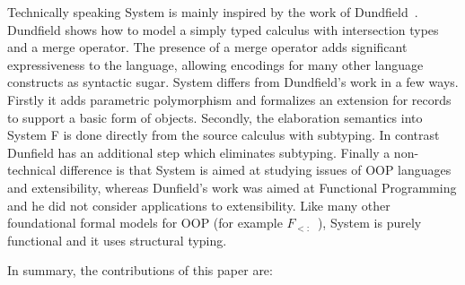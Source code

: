 Technically speaking System \name is mainly inspired by the work of
Dundfield~\cite{dunfield2014elaborating}.  Dundfield shows how to model a simply typed
calculus with intersection types and a merge operator. The presence of
a merge operator adds significant expressiveness to the language,
allowing encodings for many other language constructs as syntactic
sugar. System \name differs from Dundfield's work in a few
ways. Firstly it adds parametric polymorphism and formalizes an
extension for records to support a basic form of objects. Secondly,
the elaboration semantics into System F is done directly from the
source calculus with subtyping. In contrast Dunfield has an additional
step which eliminates subtyping.  Finally a non-technical difference
is that System \name is aimed at studying issues of OOP languages and
extensibility, whereas Dunfield's work was aimed at Functional
Programming and he did not consider applications to extensibility.
Like many other foundational formal models for OOP (for
example $F_{<:}$~\cite{CMMS}), System \name is purely functional and it uses
structural typing.


\begin{comment}
We present a polymorphic calculus containing intersection types and records, and show
how this language can be used to solve various common tasks in functional
programming in a nicer way.Intersection types provides a power mechanism for functional programming, in
particular for extensibility and allowing new forms of composition.

Prototype-based programming is one of the two major styles of object-oriented
programming, the other being class-based programming which is featured in
languages such as Java and C\#. It has gained increasing popularity recently
with the prominence of JavaScript in web applications. Prototype-based
programming supports highly dynamic behaviors at run time that are not possible
with traditional class-based programming. However, despite its flexibility,
prototype-based programming is often criticized over concerns of correctness and
safety. Furthermore, almost all prototype-based systems rely on the fact that
the language is dynamically typed and interpreted.
\end{comment}

In summary, the contributions of this paper are:

